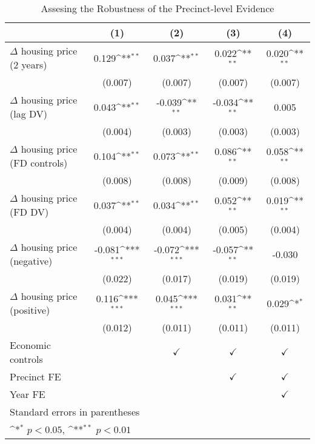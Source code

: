 \begin{table}[htbp]\centering
	\def\sym#1{\ifmmode^{#1}\else\(^{#1}\)\fi}
	\caption{Assesing the Robustness of the Precinct-level Evidence} \label{robustness}
	\begin{tabular}{l*{4}{c}}
		\hline\hline
		&\multicolumn{1}{c}{(1)}        &\multicolumn{1}{c}{(2)}        &\multicolumn{1}{c}{(3)}        &\multicolumn{1}{c}{(4)}        \\
\hline
$\Delta$ housing price (2 years)&       0.129\sym{**}&       0.037\sym{**}&       0.022\sym{**}&       0.020\sym{**}\\
&     (0.007)        &     (0.007)        &     (0.007)        &     (0.007)        \\
[1em]
$\Delta$ housing price (lag DV)&       0.043\sym{**}&      -0.039\sym{**}&      -0.034\sym{**}&       0.005        \\
&     (0.004)        &     (0.003)        &     (0.003)        &     (0.003)        \\
[1em]
$\Delta$ housing price (FD controls)&       0.104\sym{**}&       0.073\sym{**}&       0.086\sym{**}&       0.058\sym{**}\\
&     (0.008)        &     (0.008)        &     (0.009)        &     (0.008)        \\
[1em]
$\Delta$ housing price (FD DV)&       0.037\sym{**}&       0.034\sym{**}&       0.052\sym{**}&       0.019\sym{**}\\
&     (0.004)        &     (0.004)        &     (0.005)        &     (0.004)        \\
[1em]
$\Delta$ housing price (negative)&      -0.081\sym{***}&      -0.072\sym{***}&      -0.057\sym{**} &      -0.030         \\
&     (0.022)         &     (0.017)         &     (0.019)         &     (0.019)         \\
[1em]
$\Delta$ housing price (positive)&       0.116\sym{***}&       0.045\sym{***}&       0.031\sym{**} &       0.029\sym{*}  \\
&     (0.012)         &     (0.011)         &     (0.011)         &     (0.011)         \\
[1em]
\hline Economic controls  &                    & $\checkmark$                    &$\checkmark$        &$\checkmark$        \\
[1em]
Precinct FE  &                    &                    &$\checkmark$        &$\checkmark$        \\
[1em]
Year FE             &                    &                    &                    &$\checkmark$        \\
\hline\hline
\multicolumn{5}{l}{\footnotesize Standard errors in parentheses}\\
\multicolumn{5}{l}{\footnotesize \sym{*} \(p<0.05\), \sym{**} \(p<0.01\)}\\
\end{tabular}
\end{table}